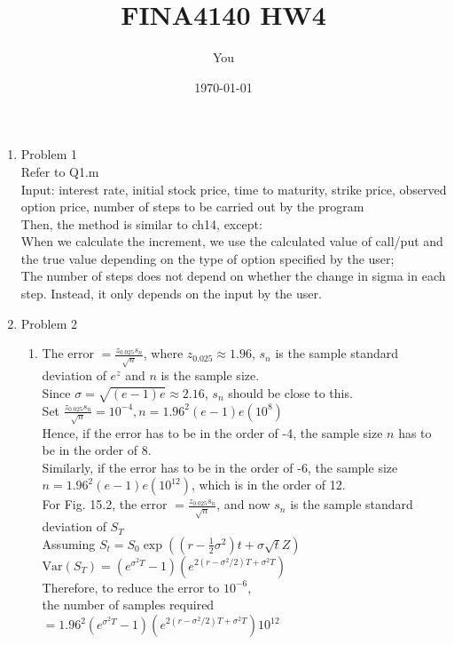 \documentclass[a4paper]{article}
\title{FINA4140 HW4}
\author{You}
\date{\today}
\def\lb{\left(}
\def\rb{\right)}
\def\Var{\mathrm{Var}}
\begin{document}
\begin{enumerate}
\item Problem 1\\
Refer to Q1.m\\
Input: interest rate, initial stock price, time to maturity, strike price, observed option price, number of steps to be carried out by the program\\
Then, the method is similar to ch14, except:\\
When we calculate the increment, we use the calculated value of call/put and the true value depending on the type of option specified by the user;\\
The number of steps does not depend on whether the change in sigma in each step. Instead, it only depends on the input by the user.



\pagebreak

\item Problem 2
\begin{enumerate}
\item
The error $=\frac{z_{0.025}s_n}{\sqrt{n}}$, where $z_{0.025}\approx 1.96$, $s_n$ is the sample standard deviation of $e^z$ and $n$ is the sample size.\\
Since $\sigma=\sqrt{(e-1)e}\approx 2.16$, $s_n$ should be close to this.\\
Set $\frac{z_{0.025}s_n}{\sqrt{n}}=10^{-4},n=1.96^2(e-1)e(10^8)$\\
Hence, if the error has to be in the order of -4, the sample size $n$ has to be in the order of 8.\\
Similarly, if the error has to be in the order of -6, the sample size $n=1.96^2(e-1)e(10^{12})$, which is in the order of 12.\\
For Fig. 15.2,  the error $=\frac{z_{0.025}s_n}{\sqrt{n}}$, and now $s_n$ is the sample standard deviation of $S_T$\\
Assuming $S_t=S_0\exp\lb\lb r-\frac{1}{2}\sigma^2\rb t+\sigma\sqrt{t}Z\rb$\\
$\Var(S_T)=\lb e^{\sigma^2T}-1\rb\lb e^{2(r-\sigma^2/2)T+\sigma^2T}\rb$\\
Therefore, to reduce the error to $10^{-6}$,\\
the number of samples required $=1.96^2\lb e^{\sigma^2T}-1\rb\lb e^{2(r-\sigma^2/2)T+\sigma^2T}\rb 10^{12}$

\pagebreak


\end{enumerate}
\end{enumerate}
\end{document}
